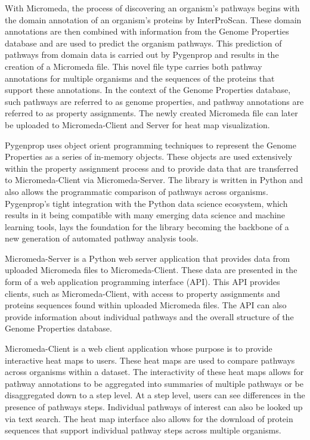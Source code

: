 With Micromeda, the process of discovering an organism's pathways begins with 
the domain annotation of an organism's proteins by InterProScan. These domain 
annotations are then combined with information from the Genome Properties 
database and are used to predict the organism pathways. This prediction of 
pathways from domain data is carried out by Pygenprop and results in the 
creation of a Micromeda file. This novel file type carries both pathway 
annotations for multiple organisms and the sequences of the proteins that 
support these annotations. In the context of the Genome Properties database, 
such pathways are referred to as genome properties, and pathway annotations are 
referred to as property assignments. The newly created Micromeda file can later 
be uploaded to Micromeda-Client and Server for heat map visualization.

Pygenprop uses object orient programming techniques to represent the Genome 
Properties as a series of in-memory objects. These objects are used extensively 
within the property assignment process and to provide data that are transferred 
to Micromeda-Client via Micromeda-Server. The library is written in Python and 
also allows the programmatic comparison of pathways across organisms. 
Pygenprop's tight integration with the Python data science ecosystem, which 
results in it being compatible with many emerging data science and machine 
learning tools, lays the foundation for the library becoming the backbone of a 
new generation of automated pathway analysis tools.

Micromeda-Server is a Python web server application that provides data from 
uploaded Micromeda files to Micromeda-Client. These data are presented in the form 
of a web application programming interface (API). This API provides clients, 
such as Micromeda-Client, with access to property assignments and proteins 
sequences found within uploaded Micromeda files. The API can also provide 
information about individual pathways and the overall structure of the Genome 
Properties database.

Micromeda-Client is a web client application whose purpose is to provide 
interactive heat maps to users. These heat maps are used to compare pathways 
across organisms within a dataset. The interactivity of these heat maps allows 
for pathway annotations to be aggregated into summaries of multiple pathways or 
be disaggregated down to a step level. At a step level, users can see 
differences in the presence of pathways steps. Individual pathways of interest
can also be looked up via text search. The heat map interface also allows for 
the download of protein sequences that support individual pathway steps across 
multiple organisms.

